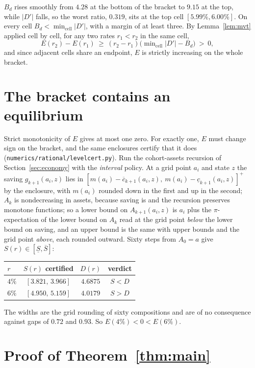 \documentclass[11pt]{article}
\theoremstyle{definition}
\theoremstyle{remark}
\begin{document}
$B_d$ rises smoothly from $4.28$ at the bottom of the bracket to $9.15$ at the top, while $|D'|$
falls, so the worst ratio, $0.319$, sits at the top cell $[5.99\%,6.00\%]$. On every cell
$B_d<\min_{\text{cell}}|D'|$, with a margin of at least three. By Lemma~\ref{lem:mvt} applied cell
by cell, for any two rates $r_1<r_2$ in the same cell,
\[
  E(r_2)-E(r_1)\ \ge\ (r_2-r_1)\bigl(\min\nolimits_{\text{cell}}|D'|-B_d\bigr)\ >\ 0,
\]
and since adjacent cells share an endpoint, $E$ is strictly increasing on the whole bracket.

\section{The bracket contains an equilibrium}\label{sec:level}

Strict monotonicity of $E$ gives at most one zero. For exactly one, $E$ must change sign on the
bracket, and the same enclosures certify that it does (\texttt{numerics/rational/levelcert.py}).
Run the cohort-assets recursion of Section~\ref{sec:economy} with the \emph{interval} policy. At a
grid point $a_i$ and state $z$ the saving $g_{k+1}(a_i,z)$ lies in
$[m(a_i)-\overline c_{k+1}(a_i,z),\ m(a_i)-\underline c_{k+1}(a_i,z)]^+$ by the enclosure, with $m(a_i)$ rounded down in the first and up in the second; $A_k$ is
nondecreasing in assets, because saving is and the recursion preserves monotone functions; so a lower
bound on $A_{k+1}(a_i,z)$ is $a_i$ plus the $\pi$-expectation of the lower bound on $A_k$ read at the
grid point \emph{below} the lower bound on saving, and an upper bound is the same with upper bounds
and the grid point \emph{above}, each rounded outward. Sixty steps from $A_0=a$ give
$S(r)\in[\underline S,\overline S]$:

\begin{center}
\begin{tabular}{@{}lccc@{}}
\toprule
$r$ & $S(r)$ certified & $D(r)$ & verdict\\
\midrule
$4\%$ & $[3.821,\,3.966]$ & $4.6875$ & $S<D$\\
$6\%$ & $[4.950,\,5.159]$ & $4.0179$ & $S>D$\\
\bottomrule
\end{tabular}
\end{center}

The widths are the grid rounding of sixty compositions and are of no consequence against gaps of
$0.72$ and $0.93$. So $E(4\%)<0<E(6\%)$.

\section{Proof of Theorem~\ref{thm:main}}\label{sec:proof}
\end{document}
